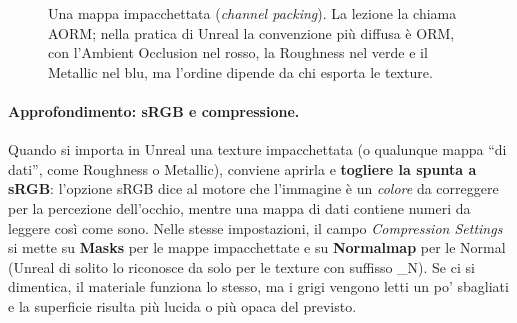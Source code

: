 \begin{figure}[htbp]
\centering
{}
\caption{Una mappa impacchettata (\emph{channel packing}). La lezione la chiama AORM;
nella pratica di Unreal la convenzione più diffusa è ORM, con l'Ambient Occlusion nel
rosso, la Roughness nel verde e il Metallic nel blu, ma l'ordine dipende da chi
esporta le texture.}
\label{ue3:fig:canali}
\end{figure}

\paragraph{Approfondimento: sRGB e compressione.} Quando si importa in Unreal una
texture impacchettata (o qualunque mappa ``di dati'', come Roughness o Metallic), conviene
aprirla e \textbf{togliere la spunta a sRGB}: l'opzione sRGB dice al motore che
l'immagine è un \emph{colore} da correggere per la percezione dell'occhio, mentre una
mappa di dati contiene numeri da leggere così come sono. Nelle stesse impostazioni, il
campo \emph{Compression Settings} si mette su \textbf{Masks} per le mappe impacchettate
e su \textbf{Normalmap} per le Normal (Unreal di solito lo riconosce da solo per le
texture con suffisso \_N). Se ci si dimentica, il materiale funziona lo stesso, ma i
grigi vengono letti un po' sbagliati e la superficie risulta più lucida o più opaca del
previsto.

